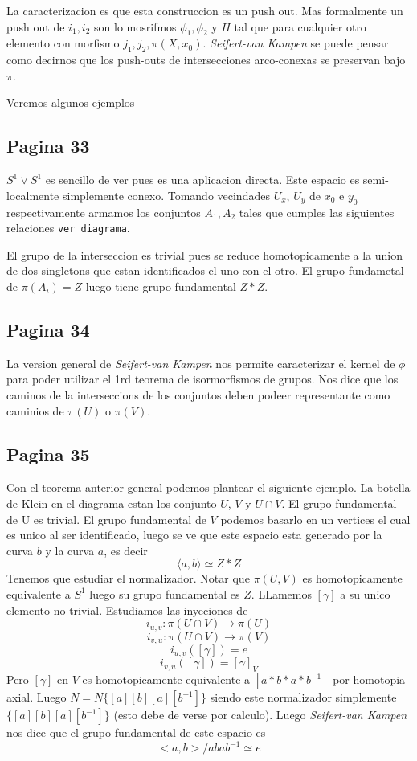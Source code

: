 \documentclass[letterpaper]{article}
\newcommand{\vank}{\emph{Seifert-van Kampen} }
\begin{document}
La caracterizacion es que esta construccion es un push out. Mas
formalmente un push out de \(i_1, i_2\) son lo mosrifmos \(\phi_1,
\phi_2\) y \(H\) tal que para cualquier otro elemento con morfismo
\(j_1, j_2 , \pi (X,x_0)\). \vank se puede pensar como decirnos que los
push-outs de intersecciones arco-conexas se preservan bajo \(\pi\).

Veremos algunos ejemplos

\subsection*{Pagina 33}
\(S^1 \vee S^1\) es sencillo de ver pues es una aplicacion directa. Este
espacio es semi-localmente simplemente conexo. Tomando vecindades
\(U_x\), \(U_y\) de \(x_0\) e \(y_0\) respectivamente armamos los
conjuntos \(A_1,A_2\) tales que cumples las siguientes relaciones
\texttt{ver diagrama}.

El grupo de la interseccion es trivial pues se reduce homotopicamente a
la union de dos singletons que estan identificados el uno con el otro.
El grupo fundametal de \(\pi(A_i) = Z\) luego tiene grupo fundamental
\(Z * Z\).

\subsection*{Pagina 34}
La version general de \vank nos permite caracterizar el kernel de
\(\phi\) para poder utilizar el 1rd teorema de isormorfismos de grupos.
Nos dice que los caminos de la interseccions de los conjuntos deben
podeer representante como caminios de \(\pi (U)\) o \(\pi (V)\).


\subsection*{Pagina 35}
Con el teorema anterior general podemos plantear el siguiente ejemplo.
La botella de Klein en  el
diagrama estan los conjunto \(U\), \(V \) y \(U \cap V\). El grupo
fundamental de U es trivial. El grupo fundamental de \(V\) podemos
basarlo en un vertices el cual es unico al ser identificado, luego se ve
que este espacio esta generado por la curva \(b\) y la curva \(a\), es
decir
\[ \langle a,b \rangle \simeq Z * Z \]
Tenemos que estudiar el normalizador. Notar que \(\pi (U,V)\) es
homotopicamente equivalente a \(S^1\) luego su grupo fundamental es
\(Z\). LLamemos \([\gamma]\) a su unico elemento no trivial. Estudiamos
las inyeciones de
\[ i_{u,v} : \pi (U \cap V) \to \pi (U )\]
\[ i_{v,u} : \pi (U \cap V) \to \pi (V) \]
\[ i_{u,v} ([\gamma]) = e \]
\[ i_{v,u} ([\gamma]) = [\gamma]_{V} \]
Pero \([\gamma]\) en \(V\) es homotopicamente equivalente a \([a * b * a *
b^{-1}]\) por homotopia axial. Luego \(N = N \{[a][b][a][b^{-1}]\}\)
siendo este normalizador simplemente \(\{[a][b][a][b^{-1}]\}\) (esto
debe de verse por calculo). Luego \vank nos dice que el grupo
fundamental de este espacio es
\[ <a,b> / {abab^{-1} \simeq e}\]
\end{document}
